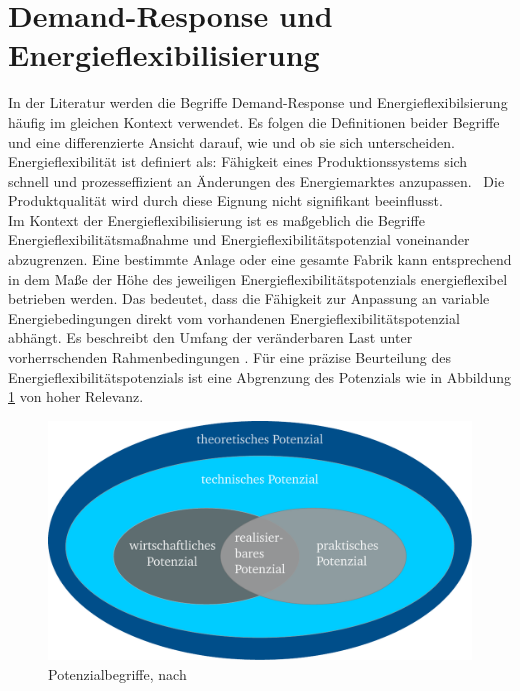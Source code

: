 \section{Demand-Response und Energieflexibilisierung}
\label{ch_03Demand-Response und Energieflexibilisierung}

In der Literatur werden die Begriffe Demand-Response und Energieflexibilsierung häufig im gleichen Kontext verwendet. Es folgen die Definitionen beider Begriffe und eine differenzierte Ansicht darauf, wie und ob sie sich unterscheiden.\\

Energieflexibilität ist definiert als: \glqq Fähigkeit eines Produktionssystems sich schnell und prozesseffizient an Änderungen des Energiemarktes anzupassen.\grqq~\cite{VDI5207Blatt2020}
Die Produktqualität wird durch diese Eignung nicht signifikant beeinflusst.\\


Im Kontext der Energieflexibilisierung ist es maßgeblich die Begriffe Energieflexibilitätsmaßnahme und Energieflexibilitätspotenzial voneinander abzugrenzen. Eine bestimmte Anlage oder eine gesamte Fabrik kann entsprechend in dem Maße der Höhe des jeweiligen Energieflexibilitätspotenzials energieflexibel betrieben werden. Das bedeutet, dass die Fähigkeit zur Anpassung an variable Energiebedingungen direkt vom vorhandenen Energieflexibilitätspotenzial abhängt. Es beschreibt den Umfang der veränderbaren Last unter vorherrschenden Rahmenbedingungen \cite{VDI5207Blatt2020}. Für eine präzise Beurteilung des Energieflexibilitätspotenzials ist eine Abgrenzung des Potenzials wie in Abbildung \ref{fig_03Potenzialbegriffe} von hoher Relevanz.\\

\begin{figure}[h]
	\centering
	\includegraphics[width=400pt]{figures/03_Grundlagen/Potenzialbegriffe.pdf}
	\caption{Potenzialbegriffe, nach \cite{VDI5207Blatt2020}}
	\label{fig_03Potenzialbegriffe}
\end{figure}

